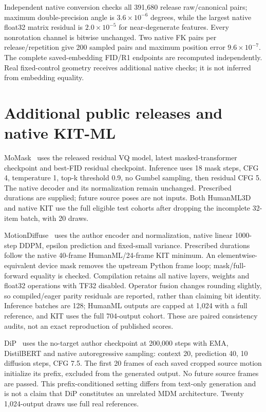 \documentclass[10pt,twocolumn,letterpaper]{article}
\begin{document}
Independent native conversion checks all 391,680 release raw/canonical pairs; maximum double-precision angle is $3.6\times 10^{-6}$ degrees, while the largest native float32 matrix residual is $2.0\times 10^{-5}$ for near-degenerate features. Every nonrotation channel is bitwise unchanged. Two native FK pairs per release/repetition give 200 sampled pairs and maximum position error $9.6\times 10^{-7}$. The complete saved-embedding FID/R1 endpoints are recomputed independently. Real fixed-control geometry receives additional native checks; it is not inferred from embedding equality.


\section{Additional public releases and native KIT-ML}

MoMask~\cite{momask2024} uses the released residual VQ model, latest masked-transformer checkpoint and best-FID residual checkpoint. Inference uses 18 mask steps, CFG 4, temperature 1, top-k threshold 0.9, no Gumbel sampling, then residual CFG 5. The native decoder and its normalization remain unchanged. Prescribed durations are supplied; future source poses are not inputs. Both HumanML3D and native KIT use the full eligible test cohorts after dropping the incomplete 32-item batch, with 20 draws.

MotionDiffuse~\cite{motiondiffuse2024} uses the author encoder and normalization, native linear 1000-step DDPM, epsilon prediction and fixed-small variance. Prescribed durations follow the native 40-frame HumanML/24-frame KIT minimum. An elementwise-equivalent device mask removes the upstream Python frame loop; mask/full-forward equality is checked. Compilation retains all native layers, weights and float32 operations with TF32 disabled. Operator fusion changes rounding slightly, so compiled/eager parity residuals are reported, rather than claiming bit identity. Inference batches are 128; HumanML outputs are capped at 1,024 with a full reference, and KIT uses the full 704-output cohort. These are paired consistency audits, not an exact reproduction of published scores.

DiP~\cite{closd2025} uses the no-target author checkpoint at 200,000 steps with EMA, DistilBERT and native autoregressive sampling: context 20, prediction 40, 10 diffusion steps, CFG 7.5. The first 20 frames of each saved cropped source motion initialize its prefix, excluded from the generated output. No future source frames are passed. This prefix-conditioned setting differs from text-only generation and is not a claim that DiP constitutes an unrelated MDM architecture. Twenty 1,024-output draws use full real references.
\end{document}
